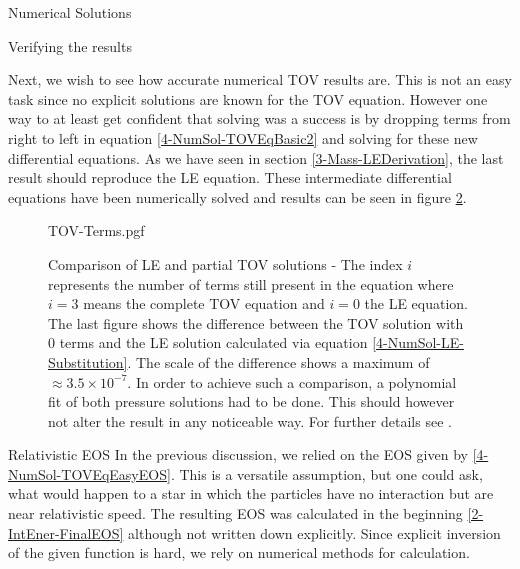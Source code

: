 \begin{section}{Numerical Solutions}
\begin{subsection}{Verifying the results}
\begin{figure}[H]
	\label{4-NumSol-ValidateLEResults}
\end{figure}\noindent
Next, we wish to see how accurate numerical TOV results are. This is not an easy task since no explicit solutions are known for the TOV equation. However one way to at least get confident that solving was a success is by dropping terms from right to left in equation \ref{4-NumSol-TOVEqBasic2} and solving for these new differential equations. As we have seen in section \ref{3-Mass-LEDerivation}, the last result should reproduce the LE equation. These intermediate differential equations have been numerically solved and results can be seen in figure \ref{4-NumSol-TovTerms}.
\begin{figure}[H]
	\centering
	{TOV-Terms.pgf}
	\caption[Comparison of LE and partial TOV solutions]{Comparison of LE and partial TOV solutions - The index $i$ represents the number of terms still present in the equation where $i=3$ means the complete TOV equation and $i=0$ the LE equation. The last figure shows the difference between the TOV solution with $0$ terms and the LE solution calculated via equation \ref{4-NumSol-LE-Substitution}. The scale of the difference shows a maximum of $\approx3.5\times10^{-7}$. In order to achieve such a comparison, a polynomial fit of both pressure solutions had to be done. This should however not alter the result in any noticeable way. For further details see \cite{pleyerGithubRepositoryJonas}.}
	\label{4-NumSol-TovTerms}
\end{figure}

\end{subsection}
%
%
\begin{subsection}{Relativistic EOS}
In the previous discussion, we relied on the EOS given by \ref{4-NumSol-TOVEqEasyEOS}. This is a versatile assumption, but one could ask, what would happen to a star in which the particles have no interaction but are near relativistic speed. The resulting EOS was calculated in the beginning \ref{2-IntEner-FinalEOS} although not written down explicitly. Since explicit inversion of the given function is hard, we rely on numerical methods for calculation.
\end{subsection}
%
%
\end{section}
